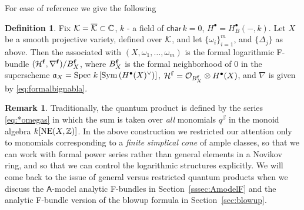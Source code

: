 \documentclass[twoside,leqno]{article}
\numberwithin{equation}{section}
\theoremstyle{plain}
\theoremstyle{definition}
\newtheorem{definition}[equation]{Definition}
\newtheorem{remark}[equation]{Remark}
\begin{document}
For ease of reference we give the following

\begin{definition} \label{def:formalFomegas} Fix 
$\mathcal K  = \overline{\mathcal K} \subset \mathbb C$, $k$ - a field of $\mathsf{char} \, k = 0$, $H^{\bullet} = H^{\bullet}_{B}(-,k)$. Let  $X$ be a smooth projective variety, defined over $\mathcal K$, and let $\{\omega_{i}\}_{i=1}^{m}$, and $\{\Delta_{j}\}$ as above. Then
the  associated
with $(X,\omega_{1},\ldots,\omega_{m})$ is the formal logarithmic F-bundle
$(\mathcal H^{\mathbf{f}},\nabla^{\mathbf{f}})/B_{X}^{\mathbf{f}}$, where $B_{X}^{\mathbf{f}}$ is the formal
neighborhood of $0$ in the superscheme ${\mathfrak{a}}_{X} = \operatorname{Spec} \,
k\left[\operatorname{Sym}\left(H^{\bullet}(X)^{\vee}\right)\right]$,
$\mathcal H^{\mathbf{f}} = \mathcal{O}_{B_{X}^{\mathbf{f}}}\otimes H^{\bullet}(X)$, and $\nabla$
is given by
\eqref{eq:formalbignabla}.
\end{definition}

\begin{remark} \label{rem:ample.choices} Traditionally, the quantum product is defined by the  series \eqref{eq:*omegas}  in which the sum is taken  over \emph{all} monomials  $q^{\beta}$ in the monoid algebra $k[\operatorname{NE}(X,\mathbb Z)]$. In the above construction we restricted our attention only to  monomials corresponding to a \emph{finite simplical cone} of ample classes, so that we can work with formal power series rather than  general elements in a Novikov ring, and so that we can control the logarithmic structures explicitly. We will come back to the issue of general versus restricted quantum products when we discuss the $\mathsf{A}$-model analytic F-bundles in Section~\ref{sssec:AmodelF}  and the analytic F-bundle version of the blowup formula in Section~\ref{sec:blowup}. 
\end{remark}
\end{document}
